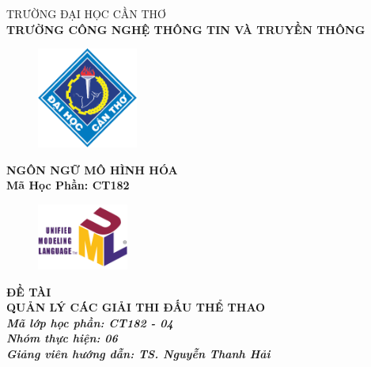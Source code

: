 \begin{titlepage}
  \begin{center}
    \vspace{-6pt}TRƯỜNG ĐẠI HỌC CẦN THƠ \\
    \textbf{\fontsize{14pt}{0pt}\selectfont TRƯỜNG CÔNG NGHỆ THÔNG TIN VÀ TRUYỀN THÔNG}
    \begin{figure}[H]
      \centering
      \includegraphics[width=3.3cm]{images/logo-ctu.png}
    \end{figure}
    \textbf{NGÔN NGỮ MÔ HÌNH HÓA} \\
    \textbf{Mã Học Phần: CT182}
    \begin{figure}[H]
      \centering
      \includegraphics[width=3cm]{images/logo-uml.png}
    \end{figure}
    \textbf{\fontsize{16pt}{0pt}\selectfont ĐỀ TÀI} \\
    \textbf{\fontsize{18pt}{0pt}\selectfont QUẢN LÝ CÁC GIẢI THI ĐẤU THỂ THAO} \\
    \vspace{0.5cm}
    \textbf{\textit{Mã lớp học phần: CT182 - 04}}\\
    \textbf{\textit{Nhóm thực hiện: 06}}\\
    \textbf{\textit{Giảng viên hướng dẫn: TS. Nguyễn Thanh Hải}}\\
    \vspace{0.5cm}
    \renewcommand{\arraystretch}{1.2}

\end{center}
\end{titlepage}
